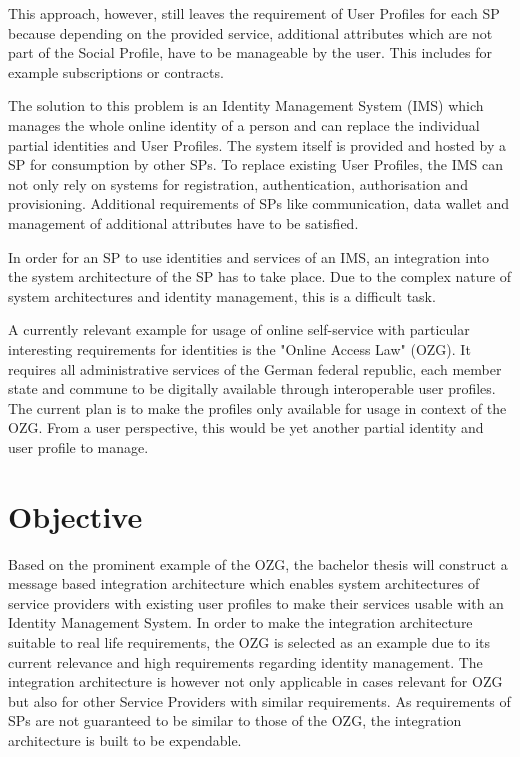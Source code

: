 \documentclass[
     12pt,         %
     a4paper,      %
     BCOR=10mm,version=first,     %
     DIV=14,version=first,        %
     ]{scrreprt}
\begin{document}
This approach, however, still leaves the requirement of User Profiles for each SP because depending on the provided service, additional attributes which are not part of the Social Profile, have to be manageable by the user. This includes for example subscriptions or contracts.

The solution to this problem is an Identity Management System (IMS) which manages the whole online identity of a person and can replace the individual partial identities and User Profiles. The system itself is provided and hosted by a SP for consumption by other SPs. To replace existing User Profiles, the IMS can not only rely on systems for registration, authentication, authorisation and provisioning. Additional requirements of SPs like communication, data wallet and management of additional attributes have to be satisfied.

In order for an SP to use identities and services of an IMS, an integration into the system architecture of the SP has to take place. Due to the complex nature of system architectures and identity management, this is a difficult task.

A currently relevant example for usage of online self-service with particular interesting requirements for identities is the "Online Access Law" (OZG). It requires all administrative services of the German federal republic, each member state and commune to be digitally available through interoperable user profiles. The current plan is to make the profiles only available for usage in context of the OZG. From a user perspective, this would be yet another partial identity and user profile to manage.

\chapter{Objective}
Based on the prominent example of the OZG, the bachelor thesis will construct a message based integration architecture which enables system architectures of service providers with existing user profiles to make their services usable with an Identity Management System. In order to make the integration architecture suitable to real life requirements, the OZG is selected as an example due to its current relevance and high requirements regarding identity management. The integration architecture is however not only applicable in cases relevant for OZG but also for other Service Providers with similar requirements. As requirements of SPs are not guaranteed to be similar to those of the OZG, the integration architecture is built to be expendable.
\end{document}
